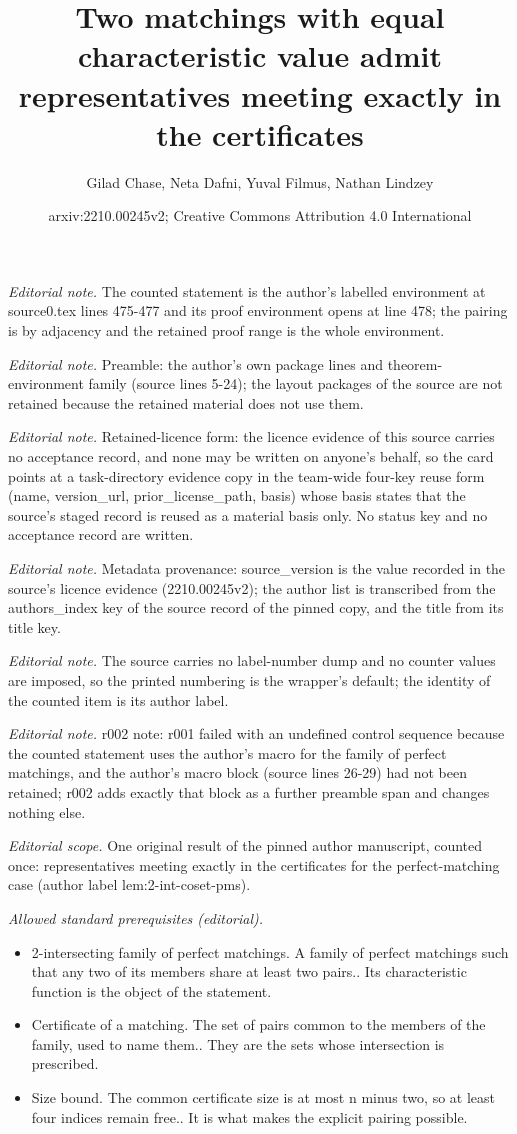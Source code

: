 \documentclass[10pt,a4paper]{article}
\title{Two matchings with equal characteristic value admit representatives meeting exactly in the certificates}
\author{Gilad Chase, Neta Dafni, Yuval Filmus, Nathan Lindzey}
\date{arxiv:2210.00245v2; Creative Commons Attribution 4.0 International}
\theoremstyle{definition}
\begin{document}
\maketitle
\noindent\textit{Editorial note.} The counted statement is the author's labelled environment at source0.tex lines 475-477 and its proof environment opens at line 478; the pairing is by adjacency and the retained proof range is the whole environment.\par\medskip
\noindent\textit{Editorial note.} Preamble: the author's own package lines and theorem-environment family (source lines 5-24); the layout packages of the source are not retained because the retained material does not use them.\par\medskip
\noindent\textit{Editorial note.} Retained-licence form: the licence evidence of this source carries no acceptance record, and none may be written on anyone's behalf, so the card points at a task-directory evidence copy in the team-wide four-key reuse form (name, version\_url, prior\_license\_path, basis) whose basis states that the source's staged record is reused as a material basis only. No status key and no acceptance record are written.\par\medskip
\noindent\textit{Editorial note.} Metadata provenance: source\_version is the value recorded in the source's licence evidence (2210.00245v2); the author list is transcribed from the authors\_index key of the source record of the pinned copy, and the title from its title key.\par\medskip
\noindent\textit{Editorial note.} The source carries no label-number dump and no counter values are imposed, so the printed numbering is the wrapper's default; the identity of the counted item is its author label.\par\medskip
\noindent\textit{Editorial note.} r002 note: r001 failed with an undefined control sequence because the counted statement uses the author's macro for the family of perfect matchings, and the author's macro block (source lines 26-29) had not been retained; r002 adds exactly that block as a further preamble span and changes nothing else.\par\medskip
\noindent\textit{Editorial scope.} One original result of the pinned author manuscript, counted once: representatives meeting exactly in the certificates for the perfect-matching case (author label lem:2-int-coset-pms).\par\medskip
\noindent\textit{Allowed standard prerequisites (editorial).}\begin{itemize}
\item 2-intersecting family of perfect matchings. A family of perfect matchings such that any two of its members share at least two pairs.. Its characteristic function is the object of the statement.
\item Certificate of a matching. The set of pairs common to the members of the family, used to name them.. They are the sets whose intersection is prescribed.
\item Size bound. The common certificate size is at most n minus two, so at least four indices remain free.. It is what makes the explicit pairing possible.
\end{itemize}\medskip
\end{document}
